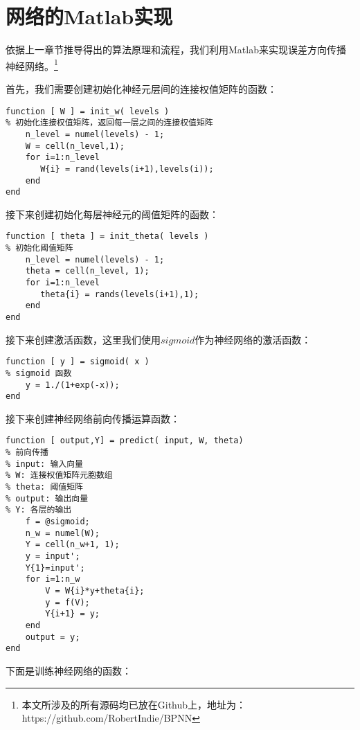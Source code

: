 \chapter{网络的Matlab实现}
\label{cha:matlabCode}

依据上一章节推导得出的算法原理和流程，我们利用Matlab来实现误差方向传播神经网络。\footnote{本文所涉及的所有源码均已放在Github上，地址为：https://github.com/RobertIndie/BPNN}

首先，我们需要创建初始化神经元层间的连接权值矩阵的函数：

\indent
\begin{lstlisting}
function [ W ] = init_w( levels )
% 初始化连接权值矩阵，返回每一层之间的连接权值矩阵
    n_level = numel(levels) - 1;
    W = cell(n_level,1);
    for i=1:n_level
       W{i} = rand(levels(i+1),levels(i));
    end
end
\end{lstlisting}

接下来创建初始化每层神经元的阈值矩阵的函数：

\begin{lstlisting}
function [ theta ] = init_theta( levels )
% 初始化阈值矩阵
    n_level = numel(levels) - 1;
    theta = cell(n_level, 1);
    for i=1:n_level
       theta{i} = rands(levels(i+1),1); 
    end
end
\end{lstlisting}

接下来创建激活函数，这里我们使用$sigmoid$作为神经网络的激活函数：

\begin{lstlisting}
function [ y ] = sigmoid( x )
% sigmoid 函数
    y = 1./(1+exp(-x));
end
\end{lstlisting}

接下来创建神经网络前向传播运算函数：

\begin{lstlisting}
function [ output,Y] = predict( input, W, theta)
% 前向传播
% input: 输入向量
% W: 连接权值矩阵元胞数组
% theta: 阈值矩阵
% output: 输出向量
% Y: 各层的输出
    f = @sigmoid;
    n_w = numel(W);
    Y = cell(n_w+1, 1);
    y = input';
    Y{1}=input';
    for i=1:n_w
        V = W{i}*y+theta{i};
        y = f(V);
        Y{i+1} = y;
    end
    output = y;
end

\end{lstlisting}

下面是训练神经网络的函数：

